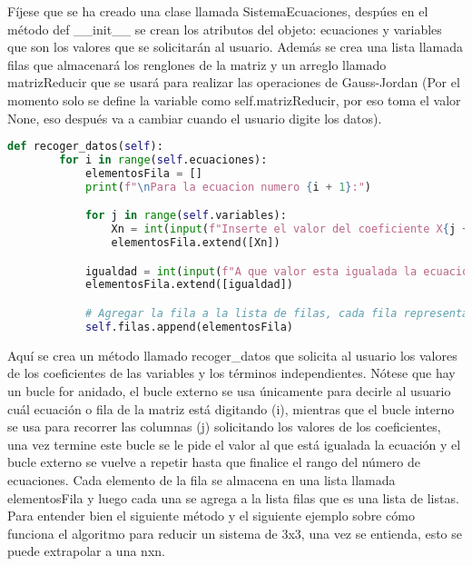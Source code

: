 \documentclass[letterpaper,12pt]{article}
\begin{document}
    Fíjese que se ha creado una clase llamada \textcolor{jl_keyword}{SistemaEcuaciones},
    despúes en el método \textcolor{jl_keyword}{def \_\_init\_\_} se crean los atributos del objeto: \textcolor{jl_keyword}{ecuaciones} y \textcolor{jl_keyword}{variables}
    que son los valores que se solicitarán al usuario.
    Además se crea una lista llamada \textcolor{jl_keyword}{filas} que almacenará 
    los renglones de la matriz y un arreglo llamado \textcolor{jl_keyword}{matrizReducir}
    que se usará para realizar las operaciones de Gauss-Jordan (Por el momento solo se define la variable como self.matrizReducir, por eso toma el valor \textcolor{jl_keyword}{None}, eso después va a cambiar cuando el usuario digite los datos).
    \\
    \begin{lstlisting}[style=jupyter, language=Python, caption={Método para recoger los datos}]
    def recoger_datos(self):
        for i in range(self.ecuaciones):
            elementosFila = []
            print(f"\nPara la ecuacion numero {i + 1}:")

            for j in range(self.variables):
                Xn = int(input(f"Inserte el valor del coeficiente X{j + 1}: "))
                elementosFila.extend([Xn])

            igualdad = int(input(f"A que valor esta igualada la ecuacion?: "))
            elementosFila.extend([igualdad])

            # Agregar la fila a la lista de filas, cada fila representa un solo elemento de la lista
            self.filas.append(elementosFila)
        \end{lstlisting}
Aquí se crea un método llamado \textcolor{jl_keyword}{recoger\_datos} que solicita al usuario los valores de los coeficientes de las variables y los términos independientes.
Nótese que hay un bucle for anidado, el bucle externo se usa únicamente para decirle al usuario 
cuál ecuación o fila de la matriz está digitando (i), mientras que el bucle interno se usa para recorrer las columnas (j)
solicitando los valores de los coeficientes, una vez termine este bucle se le pide el valor al que está igualada la ecuación
y el bucle externo se vuelve a repetir hasta que finalice el rango del número de ecuaciones.
Cada elemento de la fila se almacena en una lista llamada \textcolor{jl_keyword}{elementosFila} y luego cada una se agrega a la lista \textcolor{jl_keyword}{filas} que es una lista de listas.
\\

Para entender bien el siguiente método y el siguiente ejemplo sobre cómo funciona el algoritmo para reducir un sistema de 3x3, una vez se entienda, esto se puede extrapolar a una nxn.
\end{document}
